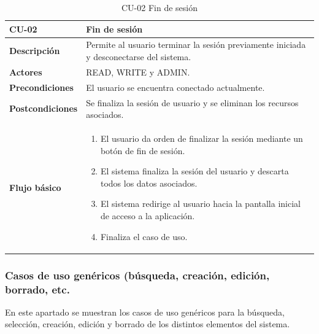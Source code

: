 \begin{table} [H]
    \centering
    \setlength{\leftmargini}{0.4cm}
	\resizebox{14cm}{!} { %
    \begin{tabular}{| m{3cm} | m{11cm} |}   
    \hline
	  \textbf{CU-02} & \textbf{Fin de sesión} \\\hline
	  \textbf{Descripción} & Permite al usuario terminar la sesión previamente iniciada y desconectarse del sistema. \\\hline
	  \textbf{Actores} & READ, WRITE y ADMIN. \\\hline
	  \textbf{Precondiciones} & El usuario se encuentra conectado actualmente. \\\hline
	  \textbf{Postcondiciones} & Se finaliza la sesión de usuario y se eliminan los recursos asociados. \\\hline
	  \textbf{Flujo básico} & 
		\begin{enumerate}
	  	\item El usuario da orden de finalizar la sesión mediante un botón de fin de sesión.
		\item El sistema finaliza la sesión del usuario y descarta todos los datos asociados.
	  	\item El sistema redirige al usuario hacia la pantalla inicial de acceso a la aplicación.		  
	   	\item Finaliza el caso de uso.
	  \end{enumerate} 	  	  
	  \\\hline
    \end{tabular}
    } %
    \caption{CU-02 Fin de sesión}
    \label{tab:cu-fin-sesion}
\end{table}




\subsubsection{Casos de uso genéricos (búsqueda, creación, edición, borrado, etc.} 
\label{sub:cu-genericos}

En este apartado se muestran los casos de uso genéricos para la búsqueda, selección, creación, edición y borrado de los distintos elementos del sistema.


